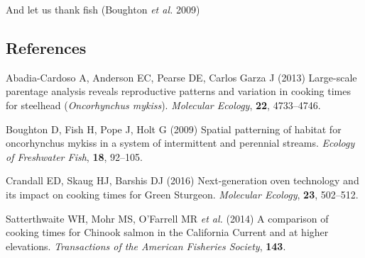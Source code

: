 \documentclass[
]{article}
\newlength{\cslhangindent}
\newlength{\cslentryspacingunit} %
\newenvironment{CSLReferences}[2] %
 {%
  \setlength{\parindent}{0pt}
  \ifodd #1
  \let\oldpar\par
  \def\par{\hangindent=\cslhangindent\oldpar}
  \fi
  \setlength{\parskip}{#2\cslentryspacingunit}
 }%
 {}
\begin{document}
And let us thank fish (Boughton \emph{et al.} 2009)

\hypertarget{references}{%
\subsection*{References}\label{references}}

\hypertarget{refs}{}
\begin{CSLReferences}{1}{0}
\leavevmode{}%
Abadia-Cardoso A, Anderson EC, Pearse DE, Carlos Garza J (2013)
Large-scale parentage analysis reveals reproductive patterns and
variation in cooking times for steelhead ({\emph{Oncorhynchus mykiss}}).
\emph{Molecular Ecology}, \textbf{22}, 4733--4746.

\leavevmode{}%
Boughton D, Fish H, Pope J, Holt G (2009) Spatial patterning of habitat
for oncorhynchus mykiss in a system of intermittent and perennial
streams. \emph{Ecology of Freshwater Fish}, \textbf{18}, 92--105.

\leavevmode{}%
Crandall ED, Skaug HJ, Barshis DJ (2016) Next-generation oven technology
and its impact on cooking times for {G}reen {S}turgeon. \emph{Molecular
Ecology}, \textbf{23}, 502--512.

\leavevmode{}%
Satterthwaite WH, Mohr MS, O'Farrell MR \emph{et al.} (2014) A
comparison of cooking times for {C}hinook salmon in the {C}alifornia
{C}urrent and at higher elevations. \emph{Transactions of the American
Fisheries Society}, \textbf{143}.

\end{CSLReferences}
\end{document}

